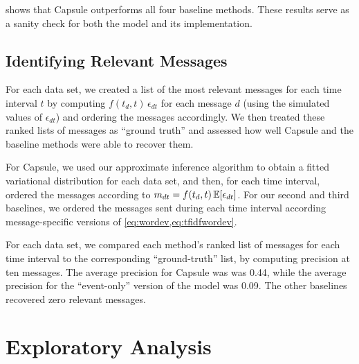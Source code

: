  shows that Capsule outperforms all four
baseline methods. These results serve as a sanity check for both the
model and its implementation.


\subsection{Identifying Relevant Messages}
\label{sec:relevant_messages}
For each data set, we created a list of the most relevant messages for
each time interval $t$ by computing $f(t_d, t)\,\epsilon_{dt}$ for
each message $d$ (using the simulated values of $\epsilon_{dt}$) and
ordering the messages accordingly. We then treated these ranked lists
of messages as ``ground truth'' and assessed how well Capsule and the
baseline methods were able to recover them.

For Capsule, we used our approximate inference algorithm to obtain a
fitted variational distribution for each data set, and then, for each
time interval, ordered the messages according to $m_{dt} = f(t_d,
t)\,\mathbb{E}[\epsilon_{dt}]$. For our second and third baselines, we ordered
the messages sent during each time interval according message-specific
versions of \cref{eq:wordev,eq:tfidfwordev}.

For each data set, we compared each method's ranked list of messages
for each time interval to the corresponding ``ground-truth'' list, by
computing precision at ten messages. The average precision for Capsule
was was 0.44, while the average precision for the ``event-only''
version of the model was 0.09. The other baselines recovered zero
relevant messages.

\section{Exploratory Analysis}
\label{sec:eval}


